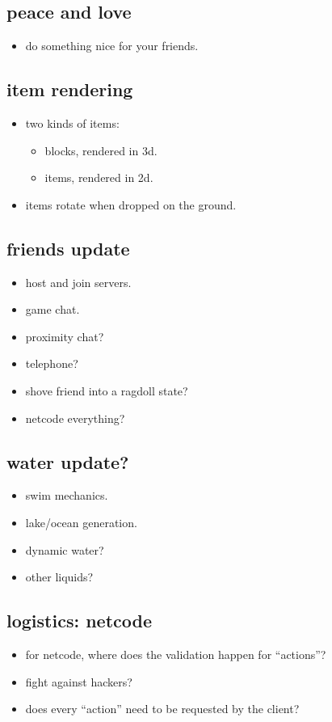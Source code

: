 \documentclass{article}
\begin{document}
\subsection*{peace and love}
\begin{itemize}
  \item do something nice for your friends.
\end{itemize}

\subsection*{item rendering}
\begin{itemize}
  \item two kinds of items:
    \begin{itemize}
      \item blocks, rendered in 3d.
      \item items, rendered in 2d.
    \end{itemize}
  \item items rotate when dropped on the ground.
\end{itemize}

\subsection*{friends update}
\begin{itemize}
  \item host and join servers.
  \item game chat.
  \item proximity chat?
  \item telephone?
  \item shove friend into a ragdoll state?
  \item netcode everything?
\end{itemize}

\subsection*{water update?}
\begin{itemize}
  \item swim mechanics.
  \item lake/ocean generation.
  \item dynamic water?
  \item other liquids?
\end{itemize}

\subsection*{logistics: netcode}
\begin{itemize}
  \item for netcode, where does the validation happen for ``actions''?
  \item fight against hackers?
  \item does every ``action'' need to be requested by the client?
\end{itemize}
\end{document}
